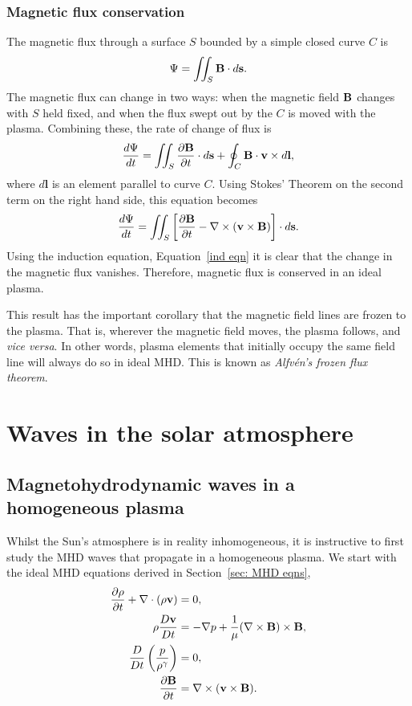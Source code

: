 \subsubsection{Magnetic flux conservation} \label{sec: mag flux conservation}
The magnetic flux through a surface $S$ bounded by a simple closed curve $C$ is
\begin{equation}
	\Psi = \iint_S \mathbf{B}\cdot d\mathbf{s}.
\end{equation}
The magnetic flux can change in two ways: when the magnetic field $\mathbf{B}$ changes with $S$ held fixed, and when the flux swept out by the $C$ is moved with the plasma. Combining these, the rate of change of flux is
\begin{equation}
	\frac{d \Psi}{dt} = \iint_S \frac{\partial\mathbf{B}}{\partial t}\cdot d\mathbf{s} + \oint_C \mathbf{B}\cdot \mathbf{v} \times d\mathbf{l},
\end{equation}
where $d\mathbf{l}$ is an element parallel to curve $C$. Using Stokes' Theorem on the second term on the right hand side, this equation becomes
\begin{equation}
\frac{d \Psi}{dt} = \iint_S \left[ \frac{\partial\mathbf{B}}{\partial t} - \nabla\times(\mathbf{v}\times\mathbf{B}) \right] \cdot d\mathbf{s}.
\end{equation}
Using the induction equation, Equation~\eqref{ind eqn} it is clear that the change in the magnetic flux vanishes. Therefore, magnetic flux is conserved in an ideal plasma.

This result has the important corollary that the magnetic field lines are frozen to the plasma. That is, wherever the magnetic field moves, the plasma follows, and \textit{vice versa}. In other words, plasma elements that initially occupy the same field line will always do so in ideal MHD. This is known as \textit{Alfv\'{e}n's frozen flux theorem}.


\section{Waves in the solar atmosphere}
\label{sec: waves}

\subsection{Magnetohydrodynamic waves in a homogeneous plasma} \label{sec: MHD waves in hom}
Whilst the Sun's atmosphere is in reality inhomogeneous, it is instructive to first study the MHD waves that propagate in a homogeneous plasma. We start with the ideal MHD equations derived in Section~\ref{sec: MHD eqns},
\begin{align}
	\frac{\partial\rho}{\partial t} + \nabla\cdot(\rho \mathbf{v}) &= 0, \\
	\rho\frac{D\mathbf{v}}{Dt} &= -\nabla p + \frac{1}{\mu}(\nabla\times\mathbf{B})\times\mathbf{B}, \\
	\frac{D}{Dt}\left(\frac{p}{\rho^\gamma}\right) &= 0, \\
	\frac{\partial\mathbf{B}}{\partial t} &= \nabla\times(\mathbf{v}\times\mathbf{B}).
\end{align}

